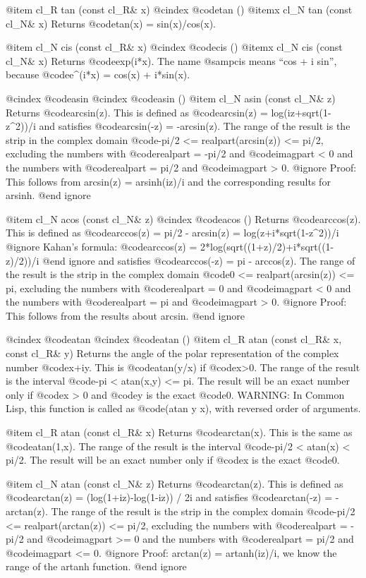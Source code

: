 @item cl_R tan (const cl_R& x)
@cindex @code{tan ()}
@itemx cl_N tan (const cl_N& x)
Returns @code{tan(x) = sin(x)/cos(x)}.

@item cl_N cis (const cl_R& x)
@cindex @code{cis ()}
@itemx cl_N cis (const cl_N& x)
Returns @code{exp(i*x)}. The name @samp{cis} means ``cos + i sin'', because
@code{e^(i*x) = cos(x) + i*sin(x)}.

@cindex @code{asin}
@cindex @code{asin ()}
@item cl_N asin (const cl_N& z)
Returns @code{arcsin(z)}. This is defined as
@code{arcsin(z) = log(iz+sqrt(1-z^2))/i} and satisfies
@code{arcsin(-z) = -arcsin(z)}.
The range of the result is the strip in the complex domain
@code{-pi/2 <= realpart(arcsin(z)) <= pi/2}, excluding the numbers
with @code{realpart = -pi/2} and @code{imagpart < 0} and the numbers
with @code{realpart = pi/2} and @code{imagpart > 0}.
@ignore
Proof: This follows from arcsin(z) = arsinh(iz)/i and the corresponding
results for arsinh.
@end ignore

@item cl_N acos (const cl_N& z)
@cindex @code{acos ()}
Returns @code{arccos(z)}. This is defined as
@code{arccos(z) = pi/2 - arcsin(z) = log(z+i*sqrt(1-z^2))/i}
@ignore
 Kahan's formula:
 @code{arccos(z) = 2*log(sqrt((1+z)/2)+i*sqrt((1-z)/2))/i}
@end ignore
and satisfies @code{arccos(-z) = pi - arccos(z)}.
The range of the result is the strip in the complex domain
@code{0 <= realpart(arcsin(z)) <= pi}, excluding the numbers
with @code{realpart = 0} and @code{imagpart < 0} and the numbers
with @code{realpart = pi} and @code{imagpart > 0}.
@ignore
Proof: This follows from the results about arcsin.
@end ignore

@cindex @code{atan}
@cindex @code{atan ()}
@item cl_R atan (const cl_R& x, const cl_R& y)
Returns the angle of the polar representation of the complex number
@code{x+iy}. This is @code{atan(y/x)} if @code{x>0}. The range of
the result is the interval @code{-pi < atan(x,y) <= pi}. The result will
be an exact number only if @code{x > 0} and @code{y} is the exact @code{0}.
WARNING: In Common Lisp, this function is called as @code{(atan y x)},
with reversed order of arguments.

@item cl_R atan (const cl_R& x)
Returns @code{arctan(x)}. This is the same as @code{atan(1,x)}. The range
of the result is the interval @code{-pi/2 < atan(x) < pi/2}. The result
will be an exact number only if @code{x} is the exact @code{0}.

@item cl_N atan (const cl_N& z)
Returns @code{arctan(z)}. This is defined as
@code{arctan(z) = (log(1+iz)-log(1-iz)) / 2i} and satisfies
@code{arctan(-z) = -arctan(z)}. The range of the result is
the strip in the complex domain
@code{-pi/2 <= realpart(arctan(z)) <= pi/2}, excluding the numbers
with @code{realpart = -pi/2} and @code{imagpart >= 0} and the numbers
with @code{realpart = pi/2} and @code{imagpart <= 0}.
@ignore
Proof: arctan(z) = artanh(iz)/i, we know the range of the artanh function.
@end ignore

